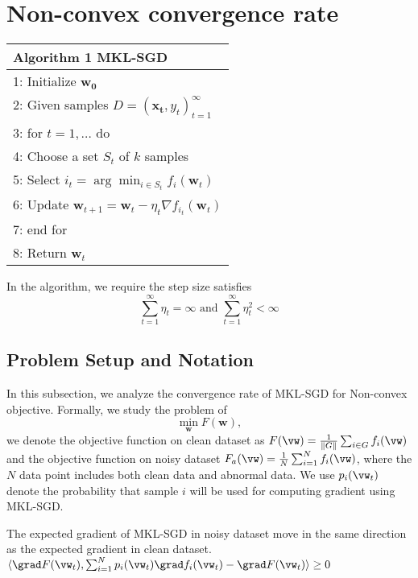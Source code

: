 


\section{Non-convex convergence rate}

{\centering
\begin{tabular}{l} 
Algorithm 1 MKL-SGD \\
\hline 1: Initialize $\boldsymbol{w}_{\mathbf{0}}$ \\
2: Given samples $D=\left(\boldsymbol{x}_{\boldsymbol{t}}, y_{t}\right)_{t=1}^{\infty}$ \\
3: for $t=1, \ldots$ do \\
4: Choose a set $S_{t}$ of $k$ samples \\
5: Select $i_{t}=\arg \min _{i \in S_{t}} f_{i}\left(\boldsymbol{w}_{t}\right)$ \\
6: Update $\boldsymbol{w}_{t+1}=\boldsymbol{w}_{t}-\eta_t \nabla f_{i_{t}}\left(\boldsymbol{w}_{t}\right)$ \\
7: end for \\
8: Return $\boldsymbol{w}_{t}$ \\
\hline
\end{tabular}}
In the algorithm, we require the step size satisfies
\begin{equation}
\sum_{t=1}^{\infty} \eta_t = \infty \text{ and } \sum_{t=1}^{\infty}\eta_t^2 < \infty
\label{eq:stepsize}
\end{equation}


\subsection{Problem Setup and Notation}
In this subsection, we analyze the convergence rate of MKL-SGD for Non-convex objective. Formally, 
we study the problem of 
 $$\min _{\boldsymbol{w}} F(\boldsymbol{w}),$$
we denote the objective function on clean dataset as $F(\vw) = \frac{1}{\|G\|} \sum_{i \in G} f_i(\vw)$ and
the objective function on noisy dataset $F_a(\vw) =\frac{1}{N} \sum_{i=1}^N f_i(\vw)$, where the
$N$ data point includes both clean data and abnormal data. 
We use $p_i(\vw_t)$ denote the probability that sample $i$ will be used for computing
gradient using MKL-SGD.

\begin{assumption}
The expected gradient of MKL-SGD in noisy dataset move in the same direction as the 
expected gradient in clean dataset.
$\langle \grad F(\vw_t),\sum_{i=1}^N p_i(\vw_t)\grad f_i(\vw_t) - \grad F(\vw_t) \rangle \geq 0$
\label{ass:gp}
\end{assumption}


